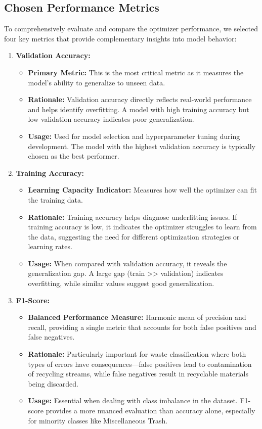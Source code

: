 \documentclass[12pt,a4paper]{article}
\begin{document}
\subsection{Chosen Performance Metrics}

To comprehensively evaluate and compare the optimizer performance, we selected four key metrics that provide complementary insights into model behavior:

\begin{enumerate}
    \item \textbf{Validation Accuracy:}
    \begin{itemize}
        \item \textbf{Primary Metric:} This is the most critical metric as it measures the model's ability to generalize to unseen data.
        \item \textbf{Rationale:} Validation accuracy directly reflects real-world performance and helps identify overfitting. A model with high training accuracy but low validation accuracy indicates poor generalization.
        \item \textbf{Usage:} Used for model selection and hyperparameter tuning during development. The model with the highest validation accuracy is typically chosen as the best performer.
    \end{itemize}
    
    \item \textbf{Training Accuracy:}
    \begin{itemize}
        \item \textbf{Learning Capacity Indicator:} Measures how well the optimizer can fit the training data.
        \item \textbf{Rationale:} Training accuracy helps diagnose underfitting issues. If training accuracy is low, it indicates the optimizer struggles to learn from the data, suggesting the need for different optimization strategies or learning rates.
        \item \textbf{Usage:} When compared with validation accuracy, it reveals the generalization gap. A large gap (train >> validation) indicates overfitting, while similar values suggest good generalization.
    \end{itemize}
    
    \item \textbf{F1-Score:}
    \begin{itemize}
        \item \textbf{Balanced Performance Measure:} Harmonic mean of precision and recall, providing a single metric that accounts for both false positives and false negatives.
        \item \textbf{Rationale:} Particularly important for waste classification where both types of errors have consequences—false positives lead to contamination of recycling streams, while false negatives result in recyclable materials being discarded.
        \item \textbf{Usage:} Essential when dealing with class imbalance in the dataset. F1-score provides a more nuanced evaluation than accuracy alone, especially for minority classes like Miscellaneous Trash.
    \end{itemize}
    

\end{enumerate}
\end{document}
